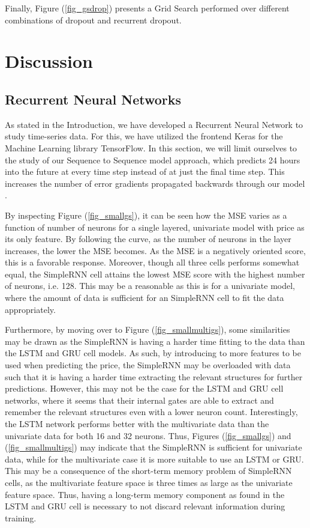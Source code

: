 \documentclass
[twocolumn,
secnumarabic,
nobibnotes,
aps,
prl,
reprint,
groupedaddress,
amsmath,
amssymb,
]{revtex4-2}
\begin{document}
Finally, Figure (\ref{fig_gsdrop}) presents a Grid Search performed over different combinations of dropout and recurrent dropout. 


\section{Discussion}

\subsection{Recurrent Neural Networks}
As stated in the Introduction, we have developed a Recurrent Neural Network to study time-series data. For this, we have utilized the frontend Keras for the Machine Learning library TensorFlow. In this section, we will limit ourselves to the study of our Sequence to Sequence model approach, which predicts 24 hours into the future at every time step instead of at just the final time step. This increases the number of error gradients propagated backwards through our model \cite{Geron2019}. 

By inspecting Figure (\ref{fig_smallgs}), it can be seen how the MSE varies as a function of number of neurons for a single layered, univariate model with price as its only feature. By following the curve, as the number of neurons in the layer increases, the lower the MSE becomes. As the MSE is a negatively oriented score, this is a favorable response. Moreover, though all three cells performs somewhat equal, the SimpleRNN cell attains the lowest MSE score with the highest number of neurons, i.e. 128. This may be a reasonable as this is for a univariate model, where the amount of data is sufficient for an SimpleRNN cell to fit the data appropriately. 

Furthermore, by moving over to Figure (\ref{fig_smallmultigs}), some similarities may be drawn as the SimpleRNN is having a harder time fitting to the data than the LSTM and GRU cell models. As such, by introducing to more features to be used when predicting the price, the SimpleRNN may be overloaded with data such that it is having a harder time extracting the relevant structures for further predictions. However, this may not be the case for the LSTM and GRU cell networks, where it seems that their internal gates are able to extract and remember the relevant structures even with a lower neuron count. Interestingly, the LSTM network performs better with the multivariate data than the univariate data for both 16 and 32 neurons. Thus, Figures (\ref{fig_smallgs}) and (\ref{fig_smallmultigs}) may indicate that the SimpleRNN is sufficient for univariate data, while for the multivariate case it is more suitable to use an LSTM or GRU. This may be a consequence of the short-term memory problem of SimpleRNN cells, as the multivariate feature space is three times as large as the univariate feature space. Thus, having a long-term memory component as found in the LSTM and GRU cell is necessary to not discard relevant information during training.
\end{document}
